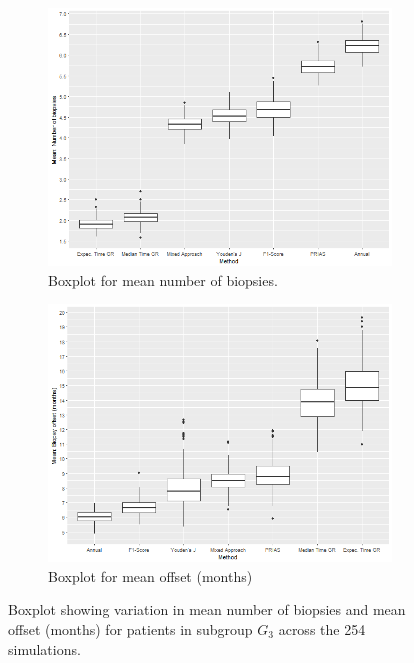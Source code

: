 \begin{figure}[!htb]
    \centering
    \captionsetup{justification=centering}
     \begin{subfigure}[b]{0.45\textwidth}
        \includegraphics[width=\textwidth]{images/sim_study/nbMeanBoxPlot_scale_6.png}
        \caption{Boxplot for mean number of biopsies.}
        \label{fig : nbMeanBoxPlot_G3}
    \end{subfigure}
    \begin{subfigure}[b]{0.45\textwidth}
        \includegraphics[width=\textwidth]{images/sim_study/offsetMeanBoxPlot_scale_6.png}
        \caption{Boxplot for mean offset (months)}
        \label{fig : offsetMeanBoxPlot_G3}
    \end{subfigure}      
    \caption{Boxplot showing variation in mean number of biopsies and mean offset (months) for patients in subgroup $G_3$ across the 254 simulations.}
    \label{fig : nbAndOffsetMeanBoxPlot_G3}
\end{figure}